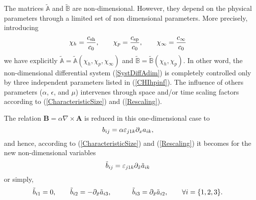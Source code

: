 \documentclass[
10pt, %
a4paper, %
oneside, %
headinclude,footinclude, %
table
]{scrartcl}
\begin{document}
\begin{remark} The matrices $\tilde{\mathbb{A}}$ and $\tilde{\mathbb{B}}$ are non-dimensional. 
However, they depend on the physical parameters through a limited set of non dimensional 
parameters. More precisely, introducing
\begin{equation}\label{CHIhpinf}
\chi_{h}=\frac{c_\text{sh}}{c_{0}}, \quad\quad
\chi_{p}=\frac{c_\text{sp}}{c_{0}}, \quad\quad
\chi_{\infty}=\frac{c_{\infty}}{c_{0}}
\end{equation}
we have explicitly $\tilde{\mathbb{A}}=\tilde{\mathbb{A}}(\chi_{h},\chi_{p},\chi_{\infty})$ and 
$\tilde{\mathbb{B}}=\tilde{\mathbb{B}}(\chi_{h},\chi_{p})$. In other word, the non-dimensional 
differential system (\ref{SystDiffAdim}) is completely controlled only by three independent 
parameters listed in (\ref{CHIhpinf}). The influence of others parameters ($\alpha$, $ \epsilon $, 
and $ \mu $) 
intervenes through space and/or time scaling factors according to (\ref{CharacteristicSize}) and 
(\ref{Rescaling}).
\end{remark} 

\begin{remark} The relation $\textbf{B}=\alpha \nabla\times \textbf{A}$ is reduced in 
this one-dimensional case to 
$$
b_{ij}=\alpha \varepsilon_{j1k}\partial_{x}a_{ik},
$$
and hence, according to  (\ref{CharacteristicSize}) and (\ref{Rescaling}) it becomes for the new 
non-dimensional variables
$$
\tilde{b}_{ij}=\varepsilon_{j1k}\partial_{\tilde{x}}\tilde{a}_{ik}
$$
or simply,
\begin{equation}\label{ABrelationAdim}
\tilde{b}_{i1}=0 , \quad \quad
\tilde{b}_{i2}=
 -\partial_{\tilde{x}}\tilde{a}_{i3},
\quad\quad\quad
\tilde{b}_{i3}=
 \partial_{\tilde{x}}\tilde{a}_{i2},
 \quad\quad
 \forall i=\{1,2,3\}.
\end{equation}
\end{remark}
\end{document}
